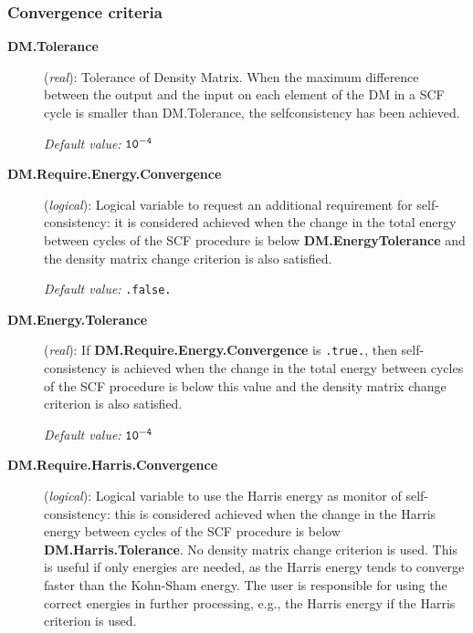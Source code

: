 \documentclass[11pt]{article}
\begin{document}
\subsubsection{Convergence criteria}

\begin{description}
\item[{\bf DM.Tolerance}] ({\it real}): 
Tolerance of Density Matrix.
When the maximum difference between the output and the
input on each element of the DM 
in a SCF cycle is smaller than DM.Tolerance,
the selfconsistency has been achieved.

{\it Default value:} {${\tt 10^{-4}}$}



\item[{\bf DM.Require.Energy.Convergence}] ({\it logical}):
Logical variable to request an additional requirement for
self-consistency: it is considered achieved when the change in the total energy between cycles
of the SCF procedure is below {\bf DM.EnergyTolerance} and the
density matrix change criterion is also satisfied.

{\it Default value:} {\tt .false.}

\item[{\bf DM.Energy.Tolerance}] ({\it real}): 
If {\bf DM.Require.Energy.Convergence} is {\tt .true.}, then
self-consistency is achieved when the change in the total energy between cycles
of the SCF procedure is below this value and the
density matrix change criterion is also satisfied.

{\it Default value:} {${\tt 10^{-4}}$}

\item[{\bf DM.Require.Harris.Convergence}] ({\it logical}):
Logical variable to use the Harris energy as monitor of
self-consistency: this is considered achieved when the change in the Harris energy between cycles
of the SCF procedure is below {\bf DM.Harris.Tolerance}. No density
matrix change criterion is used.
This is useful if only energies are needed, as the Harris energy tends
to converge faster than the Kohn-Sham energy.
The user is responsible for using the correct energies in further
processing, e.g., the Harris energy if the Harris criterion is used.


\end{description}
\end{document}
